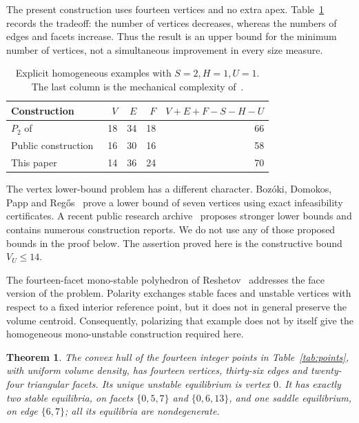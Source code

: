 \documentclass[11pt]{amsart}
\newtheorem{theorem}{Theorem}
\theoremstyle{remark}
\begin{document}
The present construction uses fourteen vertices and no extra apex. Table~\ref{tab:comparison} records the tradeoff: the number of vertices decreases, whereas the numbers of edges and facets increase. Thus the result is an upper bound for the minimum number of vertices, not a simultaneous improvement in every size measure.

\begin{table}[ht]
\centering
\caption{Explicit homogeneous examples with $S=2,H=1,U=1$. The last column is the mechanical complexity of~\cite{DKLRV20}.}\label{tab:comparison}
\begin{tabular}{lrrrr}
\toprule
Construction & $V$ & $E$ & $F$ & $V+E+F-S-H-U$\\
\midrule
$P_2$ of~\cite{DKLRV20} & 18 & 34 & 18 & 66\\
Public construction~\cite{Public16} & 16 & 30 & 16 & 58\\
This paper & 14 & 36 & 24 & 70\\
\bottomrule
\end{tabular}
\end{table}

The vertex lower-bound problem has a different character. Boz\'oki, Domokos, Papp and Reg\H{o}s~\cite{BDPR24} prove a lower bound of seven vertices using exact infeasibility certificates. A recent public research archive~\cite{Hum26} proposes stronger lower bounds and contains numerous construction reports. We do not use any of those proposed bounds in the proof below. The assertion proved here is the constructive bound $V_U\le14$.

The fourteen-facet mono-stable polyhedron of Reshetov~\cite{Res14} addresses the face version of the problem. Polarity exchanges stable faces and unstable vertices with respect to a fixed interior reference point, but it does not in general preserve the volume centroid. Consequently, polarizing that example does not by itself give the homogeneous mono-unstable construction required here.

\begin{theorem}\label{thm:main}
The convex hull of the fourteen integer points in Table~\ref{tab:points}, with uniform volume density, has fourteen vertices, thirty-six edges and twenty-four triangular facets. Its unique unstable equilibrium is vertex $0$. It has exactly two stable equilibria, on facets $\{0,5,7\}$ and $\{0,6,13\}$, and one saddle equilibrium, on edge $\{6,7\}$; all its equilibria are nondegenerate.
\end{theorem}
\end{document}
